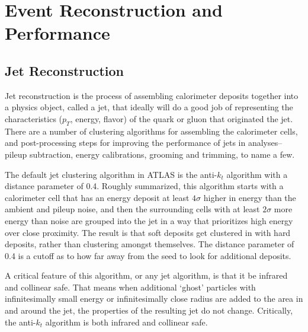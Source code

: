  

\chapter[Reconstruction and Performance]{Event Reconstruction and Performance}



\section{Jet Reconstruction}
Jet reconstruction is the process of assembling calorimeter deposits together into a physics object, called a jet, that ideally will do a good job of representing the characteristics ($p_T$, energy, flavor) of the quark or gluon that originated the jet.  There are a number of clustering algorithms for assembling the calorimeter cells, and post-processing steps for improving the performance of jets in analyses--pileup subtraction, energy calibrations, grooming and trimming, to name a few.  

The default jet clustering algorithm in ATLAS is the anti-$k_t$ algorithm with a distance parameter of 0.4.  Roughly summarized, this algorithm starts with a calorimeter cell that has an energy deposit at least $4\sigma$ higher in energy than the ambient and pileup noise, and then the surrounding cells with at least $2\sigma$ more energy than noise are grouped into the jet in a way that prioritizes high energy over close proximity.  The result is that soft deposits get clustered in with hard deposits, rather than clustering amongst themselves.  The distance parameter of 0.4 is a cutoff as to how far away from the seed to look for additional deposits.  

A critical feature of this algorithm, or any jet algorithm, is that it be infrared and collinear safe.  That means when additional `ghost' particles with infinitesimally small energy or infinitesimally close radius are added to the area in and around the jet, the properties of the resulting jet do not change.  Critically, the anti-$k_t$ algorithm is both infrared and collinear safe.






